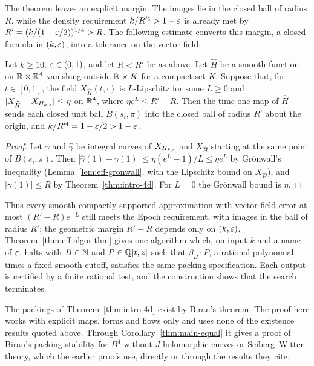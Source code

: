 The theorem leaves an explicit margin. The images lie in the closed ball of radius $R$, while the density requirement
$k/R'^4>1-\varepsilon$ is already met by $R'=(k/(1-\varepsilon/2))^{1/4}>R$. The following estimate converts this margin, a closed
formula in $(k,\varepsilon)$, into a tolerance on the vector field.

\begin{mainproposition}[Robustness]\label{thm:intro-stability}
Let $k\ge10$, $\varepsilon\in(0,1)$, and let $R<R'$ be as above. Let $\widehat H$ be a smooth function on $\mathbb{R}\times\mathbb{R}^4$
vanishing outside $\mathbb{R}\times K$ for a compact set $K$. Suppose that, for $t\in[0,1]$, the field $X_{\widehat H}(t,\cdot)$
is $L$-Lipschitz for some $L\ge0$ and $|X_{\widehat H}-X_{H_{k,\varepsilon}}|\le\eta$ on $\mathbb{R}^4$, where $\eta e^L\le R'-R$. Then the time-one map
of $\widehat H$ sends each closed unit ball $B(s_i,\pi)$ into the closed ball of radius $R'$ about the origin, and
$k/R'^4=1-\varepsilon/2>1-\varepsilon$.
\end{mainproposition}

\begin{proof}
Let $\gamma$ and $\hat\gamma$ be integral curves of $X_{H_{k,\varepsilon}}$ and $X_{\widehat H}$ starting at the same point of
$B(s_i,\pi)$. Then $|\hat\gamma(1)-\gamma(1)|\le\eta(e^L-1)/L\le\eta e^L$ by Gr\"onwall's inequality
(Lemma~\ref{lem:eff-gronwall}, with the Lipschitz bound on $X_{\widehat H}$), and $|\gamma(1)|\le R$ by
Theorem~\ref{thm:intro-4d}. For $L=0$ the Gr\"onwall bound is $\eta$.
\end{proof}

Thus every smooth compactly supported approximation with vector-field error at most $(R'-R)e^{-L}$ still meets the
Epoch requirement, with images in the ball of radius $R'$; the geometric margin $R'-R$ depends only on $(k,\varepsilon)$. Theorem~\ref{thm:eff-algorithm} gives one
algorithm which, on input $k$ and a name of $\varepsilon$, halts with $B\in\mathbb{N}$ and $P\in\mathbb{Q}[t,z]$ such that $\beta_B\cdot P$, a
rational polynomial times a fixed smooth cutoff, satisfies the same packing specification. Each output is certified by
a finite rational test, and the construction shows that the search terminates.

The packings of Theorem~\ref{thm:intro-4d} exist by Biran's theorem. The proof here works with explicit maps, forms and
flows only and uses none of the existence results quoted above. Through Corollary~\ref{thm:main-equal} it gives a proof
of Biran's packing stability for $B^4$ without $J$-holomorphic curves or Seiberg--Witten theory, which the earlier
proofs \cite{Biran1997,Biran1999,BuseHind2013,BuseHindOpshtein2016} use, directly or through the results they cite.

